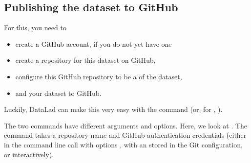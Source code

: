 \ignorespaces 

\subsection{Publishing the dataset to GitHub}
\label{\detokenize{basics/101-130-yodaproject:publishing-the-dataset-to-github}}\label{\detokenize{basics/101-130-yodaproject:publishtogithub}}\label{\detokenize{basics/101-130-yodaproject:index-12}}
\sphinxAtStartPar
For this, you need to
\begin{itemize}
\item {} 
\sphinxAtStartPar
create a GitHub account, if you do not yet have one

\item {} 
\sphinxAtStartPar
create a repository for this dataset on GitHub,

\item {} 
\sphinxAtStartPar
configure this GitHub repository to be a {\hyperref[\detokenize{glossary:term-sibling}]{}} of the  dataset,

\item {} 
\sphinxAtStartPar
and  your dataset to GitHub.

\end{itemize}

\ignorespaces 
\sphinxAtStartPar
Luckily, DataLad can make this very easy with the
command (or, for , ).

\sphinxAtStartPar
The two commands have different arguments and options.
Here, we look at .
The command takes a repository name and GitHub authentication credentials
(either in the command line call with options , with an   stored in the Git
configuration, or interactively).

